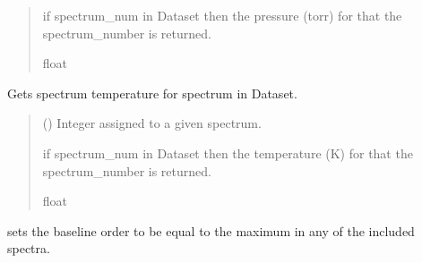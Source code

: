 \documentclass[letterpaper,10pt,english]{sphinxmanual}
\begin{document}
\begin{fulllineitems}
\begin{fulllineitems}
\begin{quote}
\begin{description}
\sphinxAtStartPar
{} \textendash{} if spectrum\_num in Dataset then the pressure (torr) for that the spectrum\_number is returned.

\sphinxAtStartPar
float

\end{description}\end{quote}

\end{fulllineitems}


\begin{fulllineitems}
\label{\detokenize{MATS:MATS.dataset.Dataset.get_spectrum_temperature}}
\pysigstartsignatures
{}
\pysigstopsignatures
\sphinxAtStartPar
Gets spectrum temperature for spectrum in Dataset.
\begin{quote}\begin{description}
\sphinxAtStartPar
{} () \textendash{} Integer assigned to a given spectrum.

\sphinxAtStartPar
{} \textendash{} if spectrum\_num in Dataset then the temperature (K) for that the spectrum\_number is returned.

\sphinxAtStartPar
float

\end{description}\end{quote}

\end{fulllineitems}


\begin{fulllineitems}
\label{\detokenize{MATS:MATS.dataset.Dataset.max_baseline_order}}
\pysigstartsignatures
{}
\pysigstopsignatures
\sphinxAtStartPar
sets the baseline order to be equal to the maximum in any of the included spectra.


\end{fulllineitems}
\end{fulllineitems}
\end{document}
